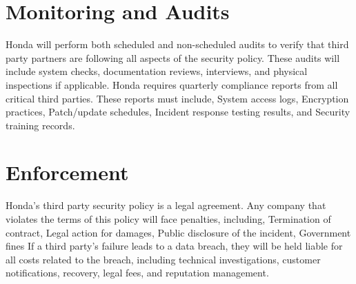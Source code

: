 \section{Monitoring and Audits}
Honda will perform both scheduled and non-scheduled audits to verify that third party partners are following all aspects of the security policy. These audits will include system checks, documentation reviews, interviews, and physical inspections if applicable. Honda requires quarterly compliance reports from all critical third parties. These reports must include, System access logs, Encryption practices, Patch/update schedules, Incident response testing results, and Security training records.

\section{Enforcement}
Honda’s third party security policy is a legal agreement. Any company that violates the terms of this policy will face penalties, including, Termination of contract, Legal action for damages, Public disclosure of the incident, Government fines
If a third party’s failure leads to a data breach, they will be held liable for all costs related to the breach, including technical investigations, customer notifications, recovery, legal fees, and reputation management.

